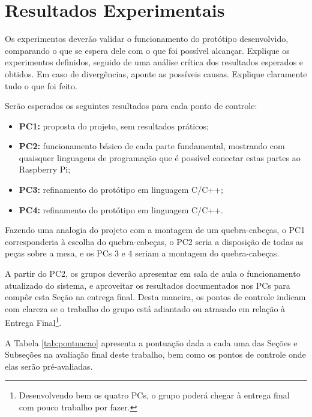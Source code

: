 \section{Resultados Experimentais}\label{sec:resultados}

Os experimentos deverão validar o funcionamento do protótipo desenvolvido, comparando o que se espera dele com o que foi possível alcançar.
Explique os experimentos definidos, seguido de uma análise crítica dos resultados esperados e obtidos.
Em caso de divergências, aponte as possíveis causas. 
Explique claramente tudo o que foi feito.

Serão esperados os seguintes resultados para cada ponto de controle:

\begin{itemize}
    \item \textbf{PC1:} proposta do projeto, sem resultados práticos;
    \item \textbf{PC2:} funcionamento básico de cada parte fundamental, mostrando com quaisquer linguagens de programação que é possível conectar estas partes ao Raspberry Pi;
    \item \textbf{PC3:} refinamento do protótipo em linguagem C/C++;
    \item \textbf{PC4:} refinamento do protótipo em linguagem C/C++.
\end{itemize}
Fazendo uma analogia do projeto com a montagem de um quebra-cabeças, o PC1 corresponderia à escolha do quebra-cabeças, o PC2 seria a disposição de todas as peças sobre a mesa, e os PCs 3 e 4 seriam a montagem do quebra-cabeças.


A partir do PC2, os grupos deverão apresentar em sala de aula o funcionamento atualizado do sistema, e aproveitar os resultados documentados nos PCs para compôr esta Seção na entrega final.
Desta maneira, os pontos de controle indicam com clareza se o trabalho do grupo está adiantado ou atrasado em relação à Entrega Final\footnote{Desenvolvendo bem os quatro PCs, o grupo poderá chegar à entrega final com pouco trabalho por fazer.}.

A Tabela \ref{tab:pontuacao} apresenta a pontuação dada a cada uma das Seções e Subseções na avaliação final deste trabalho, bem como os pontos de controle onde elas serão pré-avaliadas.

